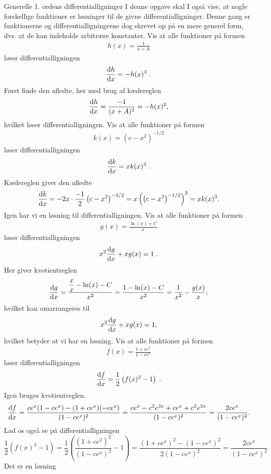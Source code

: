 \begin{opgave}[3]{Generelle 1. ordens differentialligninger}
I denne opgave skal I også vise, at nogle forskellige funktioner er løsninger til de givne differentialligninger. Denne gang er funktionerne og differentialligningerne dog skrevet op på en mere generel form, dvs. at de kan indeholde arbitrære konstanter.
\opg Vis at alle funktioner på formen
\begin{align*}
	h(x) = \frac{1}{x + A} 
\end{align*}
løser differentialligningen
\begin{align*}
	\dv{h}{x} = - h(x)^2 \; .
\end{align*}
Først finde den afledte, her med brug af kædereglen
$$
\dv{h}{x}=\frac{-1}{(x+A)^2}=-h(x)^2,
$$
hvilket løser differentialligningen.
\opg Vis at alle funktioner på formen
\begin{align*}
	k(x) = \left( c - x^2 \right)^{-1/2}
\end{align*}
løser differentialligningen
\begin{align*}
	\dv{k}{x} = x k(x)^3 \; .
\end{align*}
Kædereglen giver den afledte
$$
\dv{k}{x}=-2x\cdot \frac{-1}{2}\left(c-x^2\right)^{-3/2}=x\left(\left(c-x^2\right)^{-1/2}\right)^3=xk(x)^3.
$$
Igen har vi en løsning til differentialligningen.
\opg Vis at alle funktioner på formen
\begin{align*}
	g(x) = \frac{\ln (x) + C}{x}
\end{align*}
løser differentialligningen
\begin{align*}
	x^2 \dv{g}{x} + xg(x) = 1 \; .
\end{align*} 
Her giver kvotientreglen
$$
\dv{g}{x}=\dfrac{\dfrac{x}{x}-\ln(x)-C}{x^2}=\frac{1-\ln(x)-C}{x^2}=\frac{1}{x^2}-\frac{g(x)}{x},
$$
hvilket kan omarrangeres til
$$
x^2\dv{g}{x}+xg(x)=1,
$$
hvilket betyder at vi har en løsning.
\opg Vis at alle funktioner på formen
\begin{align*}
	f(x) = \frac{1 + ce^x}{1-ce^x}
\end{align*}
løser differentialligningen
\begin{align*}
	\dv{f}{x} = \frac{1}{2} \left( f(x)^2 - 1 \right) \; .
\end{align*} 
Igen bruges kvotientreglen.
$$
\dv{f}{x}=\frac{ce^x(1-ce^x)-(1+ce^x)(-ce^x)}{(1-ce^x)^2}=\frac{ce^x-c^2e^{2x}+ce^x+c^2e^{2x}}{(1-ce^x)^2}=\frac{2ce^x}{(1-ce^x)^2}.
$$
Lad os også se på differentialligningen
$$
\frac{1}{2}\left(f(x)^2-1\right)=\frac{1}{2}\left(\frac{(1+ce^2)^2}{(1-ce^x)^2}-1\right)=\frac{(1+ce^x)^2-(1-ce^x)^2}{2(1-ce^x)^2}=\frac{2ce^x}{(1-ce^x)^2}
$$
Det er en løsning
\end{opgave}
